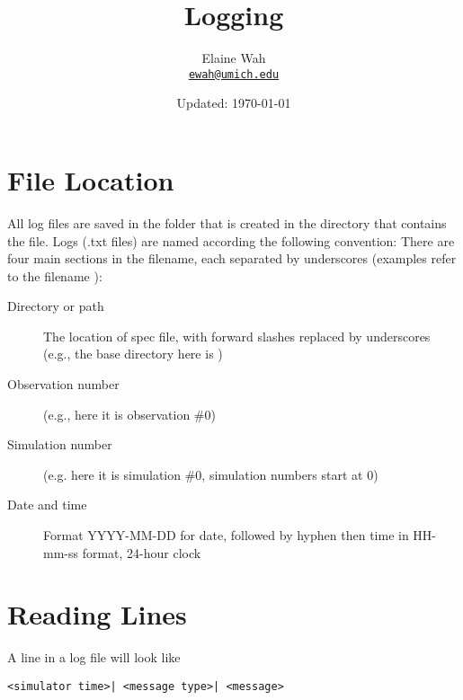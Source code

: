 \documentclass[11pt]{article}
\newcommand{\email}[1]{\href{mailto:#1}{\texttt{#1}}}
\begin{document}
	
\title{Logging}
\author{
  Elaine Wah \\
  \email{ewah@umich.edu}
}
\date{Updated: \today}
\maketitle

\section{File Location}

All log files are saved in the folder  that is created in the
directory that contains the  file.  Logs (.txt
files) are named according the following convention: There are four main sections in
the filename, each separated by underscores (examples refer to the filename
):

\begin{description}
\item[Directory or path] The location of spec file, with forward slashes replaced by
  underscores (e.g., the base directory here is )
\item[Observation number] (e.g., here it is observation \#0)
\item[Simulation number] (e.g. here it is simulation \#0, simulation numbers start at 0)
\item[Date and time] Format YYYY-MM-DD for date, followed by hyphen then time in HH-mm-ss format, 24-hour clock
\end{description}

\section{Reading Lines}

A line in a log file will look like

\begin{verbatim}
<simulator time>| <message type>| <message>
\end{verbatim}
\end{document}
